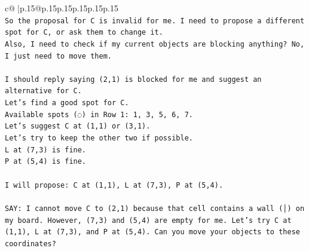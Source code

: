 \documentclass{article}
\begin{document}
{\begin{supertabular}{c@{$\;$}|p{.15\linewidth}@{}p{.15\linewidth}p{.15\linewidth}p{.15\linewidth}p{.15\linewidth}p{.15\linewidth}}
{{{\\ 
\texttt{So the proposal for C is invalid for me. I need to propose a different spot for C, or ask them to change it.} \\
\texttt{Also, I need to check if my current objects are blocking anything? No, I just need to move them.} \\
\\ 
\texttt{I should reply saying (2,1) is blocked for me and suggest an alternative for C.} \\
\texttt{Let's find a good spot for C.} \\
\texttt{Available spots (◌) in Row 1: 1, 3, 5, 6, 7.} \\
\texttt{Let's suggest C at (1,1) or (3,1).} \\
\texttt{Let's try to keep the other two if possible.} \\
\texttt{L at (7,3) is fine.} \\
\texttt{P at (5,4) is fine.} \\
\\ 
\texttt{I will propose: C at (1,1), L at (7,3), P at (5,4).} \\
\\ 
\texttt{SAY: I cannot move C to (2,1) because that cell contains a wall (│) on my board. However, (7,3) and (5,4) are empty for me. Let's try C at (1,1), L at (7,3), and P at (5,4). Can you move your objects to these coordinates?} \\
            }
        }
    }
     \\ \\


\end{supertabular}}
\end{document}
